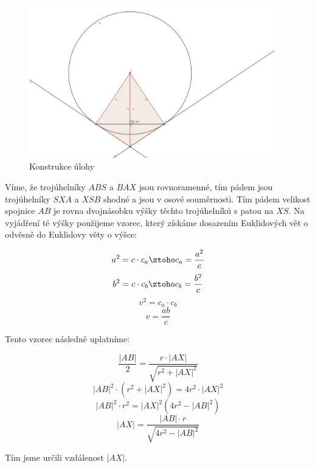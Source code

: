 \documentclass{fkssolpub}
\author{Ondřej Sedláček}
\begin{document}
\begin{figure}
	\begin{center}
		\includegraphics[width=0.95\textwidth]{A-fig}
	\end{center}
	\caption{Konstrukce úlohy}
	\label{fig:1}
\end{figure}

Víme, že trojúhelníky $ABS$ a $BAX$ jsou rovnoramenné, tím pádem jsou trojúhelníky $SXA$ a $XSB$ shodné a jsou v osové souměrnosti. Tím pádem velikost spojnice $AB$ je rovna dvojnásobku výšky těchto trojúhelníků s patou na $XS$. Na vyjádření té výšky použijeme vzorec, který získáme dosazením Euklidových vět o odvěsně do Euklidovy věty o výšce:

\[
	a^2 = c \cdot c_a \ztoho c_a = \frac{a^2}{c}
\]
\[
	b^2 = c \cdot c_b \ztoho c_b = \frac{b^2}{c}
\]
\[
	v^2 = c_a \cdot c_b
\]
\[
	v = \frac{a b}{c}
\]

Tento vzorec následně uplatníme:

\[
	\frac{|AB|}{2} = \frac{r \cdot |AX|}{\sqrt{r^2 + |AX|^2}}
\]
\[
	|AB|^2 \cdot (r^2 + |AX|^2) = 4 r^2 \cdot |AX|^2
\]
\[
	|AB|^2 \cdot r^2 = |AX|^2 (4 r^2 - |AB|^2)
\]
\[
	|AX| = \frac{|AB| \cdot r}{\sqrt{4r^2 - |AB|^2}}
\]

Tím jsme určili vzdálenost $|AX|$.
\end{document}
